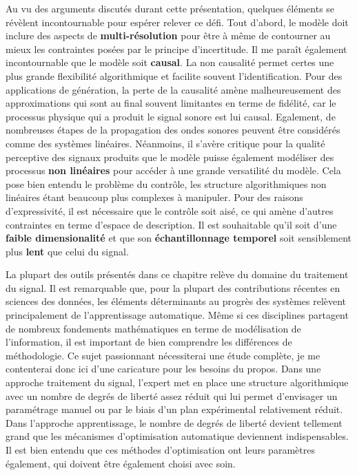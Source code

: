 Au vu des arguments discutés durant cette présentation, quelques éléments se révèlent incontournable pour espérer relever ce défi. Tout d'abord, le modèle doit inclure des aspects de \textbf{multi-résolution} pour être à même de contourner au mieux les contraintes posées par le principe d'incertitude. Il me paraît également incontournable que le modèle soit \textbf{causal}. La non causalité permet certes une plus grande flexibilité algorithmique et facilite souvent l'identification. Pour des applications de génération, la perte de la causalité amène malheureusement des approximations qui sont au final souvent limitantes en terme de fidélité, car le processus physique qui a produit le signal sonore est lui causal. Egalement, de nombreuses étapes de la propagation des ondes sonores peuvent être considérés comme des systèmes linéaires. Néanmoins, il s'avère critique pour la qualité perceptive des signaux produits que le modèle puisse également modéliser des processus \textbf{non linéaires} pour accéder à une grande versatilité du modèle. Cela pose bien entendu le problème du contrôle, les structure algorithmiques non linéaires étant beaucoup plus complexes à manipuler. Pour des raisons d'expressivité, il est nécessaire que le contrôle soit aisé, ce qui amène d'autres contraintes en terme d'espace de description. Il est souhaitable qu'il soit d'une \textbf{faible dimensionalité} et que son \textbf{échantillonnage temporel} soit sensiblement plus \textbf{lent} que celui du signal.

La plupart des outils présentés dans ce chapitre relève du domaine du traitement du signal. Il est remarquable que, pour la plupart des contributions récentes en sciences des données, les éléments déterminants au progrès des systèmes relèvent principalement de l'apprentissage automatique. Même si ces disciplines partagent de nombreux fondements mathématiques en terme de modélisation de l'information, il est important de bien comprendre les différences de méthodologie. Ce sujet passionnant nécessiterai une étude complète, je me contenterai donc ici d'une caricature pour les besoins du propos. Dans une approche traitement du signal, l'expert met en place une structure algorithmique avec un nombre de degrés de liberté assez réduit qui lui permet d'envisager un paramétrage manuel ou par le biais d'un plan expérimental relativement réduit. Dans l'approche apprentissage, le nombre de degrés de liberté devient tellement grand que les mécanismes d'optimisation automatique deviennent indispensables. Il est bien entendu que ces méthodes d'optimisation ont leurs paramètres également, qui doivent être également choisi avec soin.

